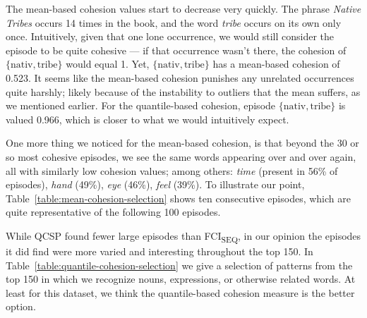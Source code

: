 The mean-based cohesion values start to decrease very quickly. The phrase \emph{Native Tribes} occurs 14 times in the book, and the word \emph{tribe} occurs on its own only once. Intuitively, given that one lone occurrence, we would still consider the episode to be quite cohesive --- if that occurrence wasn't there, the cohesion of $ \{ \text{nativ}, \text{tribe} \} $ would equal 1. Yet, $ \{ \text{nativ}, \text{tribe} \} $ has a mean-based cohesion of 0.523. It seems like the mean-based cohesion punishes any unrelated occurrences quite harshly; likely because of the instability to outliers that the mean suffers, as we mentioned earlier. For the quantile-based cohesion, episode $ \{ \text{nativ}, \text{tribe} \} $ is valued 0.966, which is closer to what we would intuitively expect.

One more thing we noticed for the mean-based cohesion, is that beyond the 30 or so most cohesive episodes, we see the same words appearing over and over again, all with similarly low cohesion values; among others: \emph{time} (present in 56\% of episodes), \emph{hand} (49\%), \emph{eye} (46\%), \emph{feel} (39\%). To illustrate our point, Table~\ref{table:mean-cohesion-selection} shows ten consecutive episodes, which are quite representative of the following 100 episodes.

While QCSP found fewer large episodes than FCI\textsubscript{SEQ}, in our opinion the episodes it did find were more varied and interesting throughout the top 150. In Table~\ref{table:quantile-cohesion-selection} we give a selection of patterns from the top 150 in which we recognize nouns, expressions, or otherwise related words. At least for this dataset, we think the quantile-based cohesion measure is the better option.

